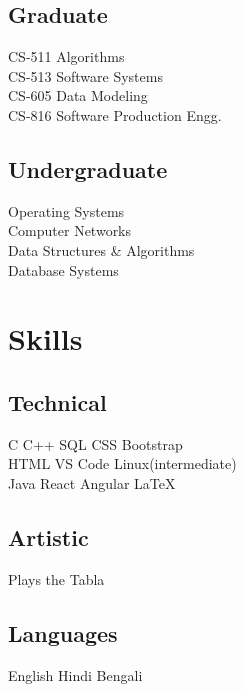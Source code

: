 \documentclass[]{essdee-resume}
\begin{document}
\begin{minipage}[t]{0.33\textwidth}
\subsection{Graduate}
CS-511  Algorithms \\
CS-513  Software Systems \\
CS-605  Data Modeling \\
CS-816 Software Production Engg. \\
\sectionsep

\subsection{Undergraduate}
Operating Systems \\
Computer Networks \\
Data Structures \& Algorithms \\
Database Systems \\



\section{Skills}
\subsection{Technical}
C \textbullet{} C++ \textbullet{} SQL \textbullet{} CSS \textbullet{} Bootstrap \\  
HTML \textbullet{} VS Code \textbullet{} Linux(intermediate) \\ 
Java \textbullet{} React \textbullet{} Angular\textbullet{}  \LaTeX\
\sectionsep

\subsection{Artistic}
Plays the Tabla \\
\sectionsep

\subsection{Languages}
English \textbullet{} Hindi \textbullet{} Bengali \\
\sectionsep




\end{minipage}
\end{document}
